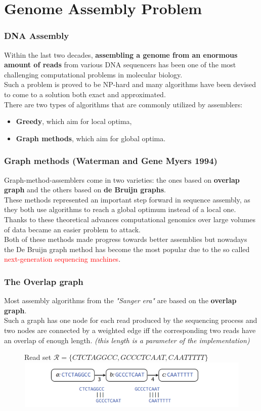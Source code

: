 \section{Genome Assembly Problem}

\begin{frame}
\frametitle{DNA Assembly}
Within the last two decades, \textbf{assembling a genome from an enormous amount of reads} from various DNA sequencers has been one of the most challenging computational problems in molecular biology.
\\ \medskip
Such a problem is proved to be NP-hard and many algorithms have been devised to come to a solution both exact and approximated.
\\ \medskip
There are two types of algorithms that are commonly utilized by assemblers:
\begin{itemize}
\item \textbf{Greedy}, which aim for local optima,
\item \textbf{Graph methods}, which aim for global optima.
\end{itemize}
\end{frame}

\begin{frame}
\frametitle{Graph methods (Waterman and Gene Myers 1994)}
Graph-method-assemblers come in two varieties: the ones based on \textbf{overlap graph} and the others based on \textbf{de Bruijn graphs}.
\\ \medskip 
These methods represented an important step forward in sequence assembly, as they both use algorithms to reach a global optimum instead of a local one.
Thanks to these theoretical advances computational genomics over large volumes of data became an easier problem to attack.
\\ \medskip
Both of these methods made progress towards better assemblies  but nowadays the De Bruijn graph method has become the most popular due to the so called \textcolor{red}{next-generation sequencing machines}.
\end{frame}

\begin{frame}
\frametitle{The Overlap graph}
Most assembly algorithms from the \textit{"Sanger era"}
are based on the \textbf{overlap graph}.
\\ \medskip
Such a graph has one node for each read produced by the sequencing process and two nodes are connected by a weighted edge iff the corresponding two reads have an overlap of enough length. \textit{(this length is a parameter of the implementation)}
\begin{figure}
	Read set $\mathcal{R} = \{CTCTAGGCC, GCCCTCAAT, CAATTTTT\}$
	\includegraphics[scale=0.33]{img/overlap-graph-simple.png}
\end{figure}
\end{frame}


